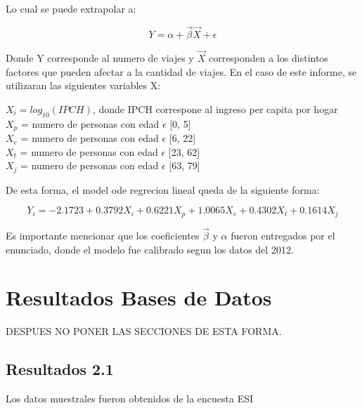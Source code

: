 \documentclass[12pt]{article} %
\begin{document}
Lo cual se puede extrapolar a:

\begin{equation}
    Y = \alpha + \vec{\beta}\vec{X} + \epsilon
\end{equation}

Donde Y corresponde al numero de viajes y $\vec{X}$ corresponden a los distintos factores que pueden afectar a la cantidad de viajes. En el caso de este informe, se utilizaran las siguientes variables X:

\begin{center}
    $X_i = log_{10}(IPCH)$, donde IPCH correspone al ingreso per capita por hogar\\
    $X_p$ = numero de personas con edad $\epsilon$ [0, 5]\\
    $X_e$ = numero de personas con edad $\epsilon$ [6, 22]\\
    $X_t$ = numero de personas con edad $\epsilon$ [23, 62]\\
    $X_j$ = numero de personas con edad $\epsilon$ [63, 79]\\
\end{center}

De esta forma, el model ode regrecion lineal queda de la siguiente forma:

\begin{equation}
    Y_i = -2.1723 + 0.3792X_i + 0.6221X_p + 1.0065X_e + 0.4302X_t + 0.1614X_j
\end{equation}

Es importante mencionar que los coeficientes $\vec{\beta}$ y $\alpha$ fueron entregados por el enunciado, donde el modelo fue calibrado segun los datos del 2012.

\section{Resultados Bases de Datos}
DESPUES NO PONER LAS SECCIONES DE ESTA FORMA.

\subsection{Resultados 2.1}

Los datos muestrales fueron obtenidos de la encuesta ESI \textbf{\cite{esi}}
\end{document}
